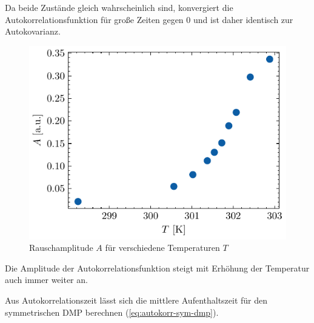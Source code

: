 \documentclass[main.tex]{subfiles}
\begin{document}
Da beide Zustände gleich wahrscheinlich sind, konvergiert die Autokorrelationsfunktion für große Zeiten gegen 0 und ist daher identisch zur Autokovarianz. 


\begin{figure}[H]
    \centering
    \includegraphics{bilder/plots/temp_comparison_long/rauschamplitude.pdf}
    \caption{Rauschamplitude $A$ für verschiedene Temperaturen $T$ }\label{fig:temp-autocorr-amplitude}
\end{figure}

Die Amplitude der Autokorrelationsfunktion steigt mit Erhöhung der Temperatur auch immer weiter an.

Aus Autokorrelationszeit lässt sich die mittlere Aufenthaltszeit für den symmetrischen DMP berechnen (\cref{eq:autokorr-sym-dmp}).


\end{document}
